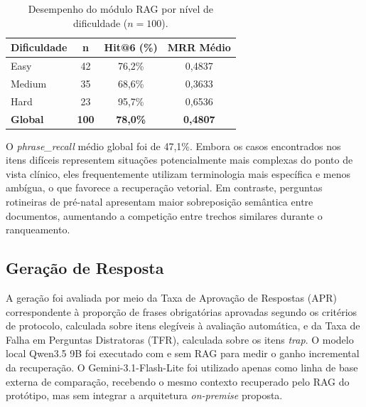\documentclass[12pt]{article}
\begin{document}
\begin{table}[H]
  \centering
  \caption{Desempenho do módulo RAG por nível de dificuldade ($n=100$).}
  \label{tab:metricas_rag}
  \small
  \begin{tabular}{lccc}
  	\toprule
  	\textbf{Dificuldade} & \textbf{n}   & \textbf{Hit@6 (\%)}  & \textbf{MRR Médio} \\
  	\midrule
  	Easy                 & 42           & 76,2\%               & 0,4837             \\
  	Medium               & 35           & 68,6\%               & 0,3633             \\
  	Hard                 & 23           & 95,7\%               & 0,6536             \\
  	\midrule
  	\textbf{Global}      & \textbf{100} & \textbf{78,0\%}      & \textbf{0,4807}    \\
  	\bottomrule
  	\end{tabular}
  \end{table}
  
O \textit{phrase\_recall} médio global foi de 47,1\%.
Embora os casos encontrados nos itens difíceis representem situações potencialmente mais complexas do ponto de vista clínico, eles frequentemente utilizam terminologia mais específica e menos ambígua, o que favorece a recuperação vetorial.
Em contraste, perguntas rotineiras de pré-natal apresentam maior sobreposição semântica entre documentos, aumentando a competição entre trechos similares durante o ranqueamento.


\subsection{Geração de Resposta}

A geração foi avaliada por meio da Taxa de Aprovação de Respostas (APR) correspondente à proporção de frases obrigatórias aprovadas segundo os critérios de protocolo, calculada sobre itens elegíveis à avaliação automática, e da Taxa de Falha em Perguntas Distratoras (TFR), calculada sobre os itens \textit{trap}.
O modelo local Qwen3.5 9B foi executado com e sem RAG para medir o ganho incremental da recuperação.
O Gemini-3.1-Flash-Lite foi utilizado apenas como linha de base externa de comparação, recebendo o mesmo contexto recuperado pelo RAG do protótipo, mas sem integrar a arquitetura \textit{on-premise} proposta.
\end{document}

